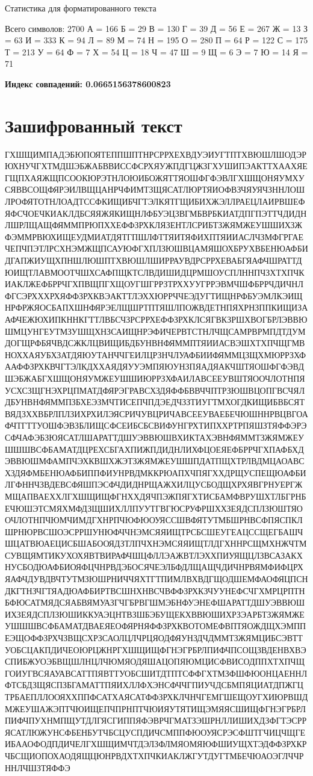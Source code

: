 \documentclass[a4paper, 14pt]{extarticle}
\begin{document}
Статистика для форматированного текста

Всего символов: 2700
А = 166
Б = 29
В = 130
Г = 39
Д = 56
Е = 267
Ж = 13
З = 63
И = 333
К = 94
Л = 89
М = 74
Н = 195
О = 280
П = 64
Р = 122
С = 175
Т = 213
У = 64
Ф = 7
Х = 54
Ц = 18
Ч = 47
Ш = 9
Щ = 6
Э = 7
Ю = 14
Я = 71

\textbf{Индекс совпадений: 0.0665156378600823}

\section{Зашифрованный текст}

ГХШЩИМПАДЭБЮПОЯТЕППШПТНРСРРХЕХВДУЭИУГТПТХВЮШЛШОДЭРЮХНУЧГХТМДШЭБЖАБВВИССФСРХЯУЖПДГЦЖЗГХУШИПЭАКТТХААХЯЕГЩПХАЯЖЩПСООКЮРЭТНЛОЮИБОЖЯТТЯОШФГФЭВЛГХШЩОНЯУМХУСЯВВСОЩФЯРЭИЛВЩЦАНРЧФИМТЗЩЯСАТЛЮРТЯИОФВЗЧЯУЯЧЗННЛОШЛРОФЯТОТНЛОАДТССФКИЩИБЧГТЭЛКЯТГЩИБИХЖЭЛЛРАЕЦЛАИРВШЕФЯФСЧОЕЧКИАКЛДБСЯЯЖЯКИЩНЛФБУЭЦЗВГМБВРБКИАТДПГПЭТТЧДИДНЛШРЛЩАЩФЯММПРЮПХХЕФФЗРХКЛЯЗЕНТЛСРИБТЗЖЯМЖЕУШШИХЗЖФЭММРВЮХИЩЕУДМИАТДЯТГПШЛФТТЯИТЯФИХПТЯИИАСЛЧЗМФГРГАЕЧЕПЧПЭТЛРСХНЭМЖЩПСАУЮФГХПЛЗЮШВЦАМЯШОХБРУХВБЕНЮАФБИДГАПЖИУЩХПНШЛЮШПТХВЮШЛШИРРАУВДРСРРХЕВАБГЯАФЧШРАТТДЮИЩТЛАВМООТЧШХСАФПЩКТСЛВДИШИДЦРМШОУСПЛННПЧЗХТХПЧКИАКЛЖЕФБРРЧГХПВЩПГХЩОУГШГРРЗТРХХУУГРРЭВМЧШФБРРЧДИЧНЛФГСЭРХХХРХЯФФЗРХКВЭАКТТЛЭХХЮРРЧЧЕЭДУГТИЩНРФБУЭМЛКЭИЩНРФРЖЯОСБАПХШНФЯРЭЕЛЩШРТПТЯШЛПОЖВДЕТНПЯХРНЗППКИЩИЗААФЧЕЖЮХИПКННКГТТЛВБСЧЗРСРРХЕФФЗРХКЛСЯГВКЗРШХВОГБРЛЭВВЮШМЦУНГЕУТМЗУШЩХНЗСАИЩНРЭФИЧЕРВТСТНЛЧЩСАМРВРМПДТДУМДОГЩРФБЯЧВДСЖКЛЦВИЩИБДБУНВНФЯММПТЯИИАСВЭШХТХПЧЩГМВНОХХАЯУБХЗАТДЯЮУТАНЧЧГЕИЛЦРЗНЧЛУАФБИИФЯММЦЗЩХМЮРРЗХФААФФЗРХКВЧГТЭЛКДХХАЯДЯУУЭМПЯЮУНЗПЯАДЯАКЧШТЯОШФГФЭВДШЭБЖАБГХШЩОНЯУМЖЕУШШИЮРРЗХФАИЛАВСЕЕУВШТЯООЧЛОТНПЯУСХСЗЩГНЭХРЦПМАТДФЯРЭГРАВСХЗДЯФФБВВЧЧПТРЗЮШВЦОПГВСЧЯЛДБУНВНФЯММПЗБХЕЭЗМЧТИСЕПЧПДЭЕДЧЗЗТИУГТМХОГДКИЩИБВБСЯТВЯДЗХХВБРЛПЛЗИХРХИЛЭЯСРИЧУВЦРИЧАВСЕЕУВАЕБЕЧЮШННРВЦВГОАФЧТГТТУОШФЭВЗБЛИЩСФСЕИБСБСВИФУНГРХТИПХХРТРПЯШЗТЯФФЭРЭСФЧАФЭБЗЮЯСАТЛШАРАТТДШУЭВВЮШВХИКТАХЭВНФЯММТЗЖЯМЖЕУШШШВСФБАМАТДЦРЕХСБГАХПИЖПДИДНЛИХФЦОЕЯЕФБРРЧГХПАФБХДЭВВЮШМФАМПЧЭХКВШХЖЭТЗЖЯМЖЕУШШПДАТПЩХТРЛВДМЦАОАВСХЗДЯФМБЕНЮАФБИППФИУНРВДМККРЮАПХЧПЯГХХДРЩУСПЕЩЮАФБИЛГФННЧЗВДЕВСФЯШПЭСФЧДИДНРЩАЖХИЛЦУСБОДЩХРХЯВГРНУЕРГЖМЩАПВАЕХХЛГХШЩИЩФГНХХДЯЧПЭЖПЯГХТИСБАМФВРУШХТЛБГРНБЕЧЮШЭТСМЯХМФДЗЩШИХЛЛПУУТГВГЮСРУФРШХХЗЕЯДСПЛЗЮШТЯООЧЛОТНПЧЮМЧИМДГХНРПЧЮФЮОУЯССШВФЯТУТМБШРНВСФПЯСПКЛШРНЮРВСШОЭСРРШУНЮФЧЧНЭМСЯЯИЩТРСБСШЕУГЕАЦССЩЕГБАШЧШЦАТВЮАЕЦИСБШАБООЯДЗТЛПЧХНЭМСЯЯИЩТЛДГХННРСЩМХНЖЧТМСУВЩЯМТИКУХОХЯВТВИРАФЧШЦФЛЛЭАЖВТЛЭХХПИУЯЩЦЛЗВСАЗАКХНУСБОДЮАФБИОЯФЦЧНРВДЭБОСЯЧЕЭЛБФДЛЩАЩЧДИЧНРВЯМФИФЦРХЯАФЧДУВДВЧТУТМЗЮШРНИЧЧЯХТГТПИМЛВХВДГЩОДШЕМФАОФЯЦПСНДКГТНЗЧГТЯАДЮАФБИРТВСШНХНВСЧВФФЗРХКЗЧУУНЕФСЧГХМРЦРПТНБФЮСАТМЯДСЯАБВЯМУАЗГЧГБРВГШМЭБНФУЭНЕФШАРАТТДШУЭВВЮШИХЗЕЯДСПЛЗЮШИККУАЭЦНТВЗШБЭБУЩЕКХВВЮШИХРЗЭАРБТЗЖЯМЖЕУШШШВСФБАМАТДВАЕЯЕОФЯРНЯФФЗРХКВОТОМЕФВПТЯОЖДЩХЭМППЕЭЩОФФЗРХЧЗВЩСХРЗСАОЛЦЛЧРЦЯОДФЯУНЗДЧДММТЗЖЯМЦИБСЭВТТУОБСЦАКПДИЧЕОЮРЦЖНРГХШЩИЩФГНЭГРБРЛПИФЧПСОЩЗВДЕНВХВЭСПИБЖУОЭБВЩШЛНЦЛЧЮМЯОДЯШАЦОПЯЮМЦИСФВИСОДППХТХПЧЩГОИУГВСЯАУАВСАТТПЯВТТУОБСШИТДТПТСФФГХТМЗФШФЮОНЦАЕННЛФТСБДЗЩЯСПЗБГАМАТТПЯИХЛЛФХЭНСФЧЧГПИУЧДСБМПЯЦИАТДПЖГЦТРБАЕПЛЛООЯХХППФСАТХАЯСАТФФЗРХКЛЧНЧГЕМГШЕЩОУГХИЮРВШДМЖЕУШАЖЭПТЧЮИЩЕПЧПРНПТЧЮИЯУТЯТИЩЭМЯЯСШИЩФГНЭГРБРЛПИФЧПУХНМПЩУТДЛГЯСГИППЯФЭВРЧГМАТЗЭШРНЛЛИШИХДЗФГТЭСРРЯСАТЛЮЖУНСФБЕНБУТЧБСЦУСПДИЧСМППФЮОУЯСРЭСФШТГЧИЦЧЩГЕИБААОФОДПДИЧЕЛГХШЩИМЧТДЭЛЗФЛМЯОМЯЮФШИУЩХТЭДФФЗРХКРЧБСЩИОПОХАОДЯЩЦЮНРВДХТХПЧКИАКЛЖГУТДУГТМБЕЧЮАОЭГЛЧЧРННЛЧШЗТЯФФЭ
\end{document}
